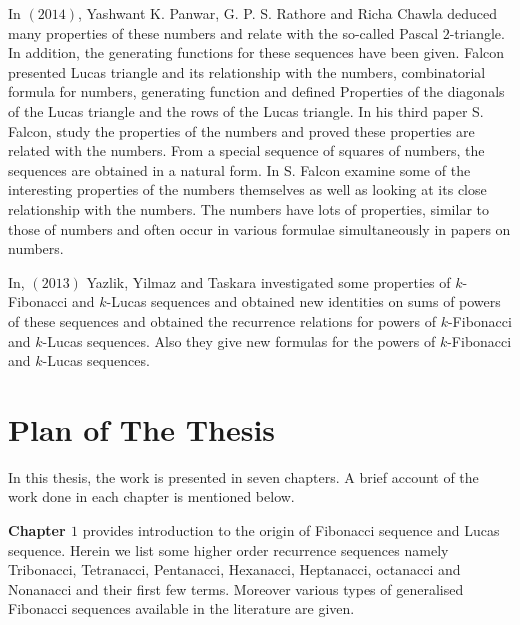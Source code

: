 \begin{large}
\noindent In $(2014)$, Yashwant K. Panwar, G. P. S. Rathore and Richa Chawla\cite{panwar} deduced many properties of these numbers and relate with the so-called Pascal $2$-triangle. In addition, the generating functions for these \kF\hspace{0mm} sequences have been given. Falcon presented Lucas triangle and its relationship with the \kL\hspace{0mm} numbers, combinatorial formula for \kL\hspace{0mm} numbers, generating function and defined Properties of the diagonals of the Lucas triangle and the rows of the Lucas triangle. In his third paper S. Falcon, study the properties of the \kL\hspace{0mm} numbers and proved these properties are related with the \kF\hspace{0mm} numbers. From a special sequence of squares of \kF\hspace{0mm} numbers, the \kL\hspace{0mm} sequences are obtained in a natural form. In S. Falcon examine some of the interesting properties of the \kL\hspace{0mm} numbers themselves as well as looking at its close relationship with the \kF\hspace{0mm} numbers. The \kL\hspace{0mm} numbers have lots of properties, similar to those of \kF\hspace{0mm} numbers and often occur in various formulae simultaneously in papers on \kF\hspace{0mm} numbers.

\noindent In, $(2013)$ Yazlik, Yilmaz and Taskara\cite{yilmaz} investigated some properties of $k$-Fibonacci and $k$-Lucas sequences and obtained new identities on sums of powers  of these sequences and obtained the recurrence relations for powers of $k$-Fibonacci and $k$-Lucas sequences. Also they give new formulas for the powers of $k$-Fibonacci and $k$-Lucas sequences. 
\section*{Plan of The Thesis}
\noindent In this thesis, the work is presented in seven chapters. A brief account
of the work done in each chapter is mentioned below.

\noindent \textbf{Chapter $1$} provides introduction to the origin of Fibonacci sequence and  Lucas sequence. Herein we list some higher order recurrence sequences namely Tribonacci, Tetranacci, Pentanacci, Hexanacci, Heptanacci, octanacci and Nonanacci and their first few terms. Moreover various types of generalised Fibonacci sequences available in the literature are given. 


\end{large}
